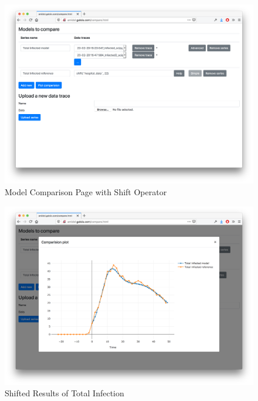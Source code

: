 \documentclass[12pt]{galois-whitepaper}
\begin{document}
\begin{figure}
  \centering
  \includegraphics[width=\textwidth]{figs/comparision-ui-5.png}
  \caption{Model Comparison Page with Shift Operator}
  \label{Fig:Comparison5}
\end{figure}

\begin{figure}
  \centering
  \includegraphics[width=\textwidth]{figs/comparision-ui-6.png}
  \caption{Shifted Results of Total Infection}
  \label{Fig:Comparison6}
\end{figure}
\end{document}
